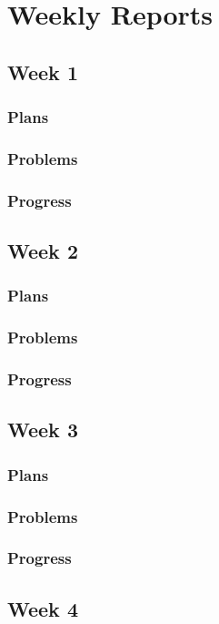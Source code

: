 \documentclass[onecolumn, draftclsnofoot, 10pt, compsoc]{IEEEtran}
\begin{document}
\section{Weekly Reports}
\subsection{Week 1}
\subsubsection{Plans}
\subsubsection{Problems}
\subsubsection{Progress}

\subsection{Week 2}
\subsubsection{Plans}
\subsubsection{Problems}
\subsubsection{Progress}

\subsection{Week 3}
\subsubsection{Plans}
\subsubsection{Problems}
\subsubsection{Progress}

\subsection{Week 4}
\end{document}
